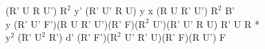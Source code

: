 (R' U R U') $\text{R}^2$ y' (R' U' R U) y x (R U R' U') $\text{R}^2$ B'\\
y (R' U' F')(R U R' U')(R' F)($\text{R}^2$ U')(R' U' R U) R' U R *\\
$\text{y}^2$ (R' $\text{U}^2$ R') d' (R' F')($\text{R}^2$ U' R' U)(R' F)(R U') F\\
